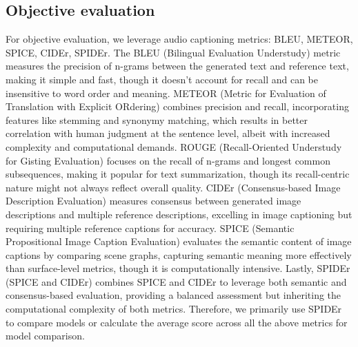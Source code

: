 \subsection{Objective evaluation} \label{appendix: evaluation}  
 \vspace{-0.1in}
For objective evaluation, we leverage audio captioning metrics: BLEU, METEOR, SPICE, CIDEr, SPIDEr. The BLEU (Bilingual Evaluation Understudy) metric measures the precision of n-grams between the generated text and reference text, making it simple and fast, though it doesn't account for recall and can be insensitive to word order and meaning. METEOR (Metric for Evaluation of Translation with Explicit ORdering) combines precision and recall, incorporating features like stemming and synonymy matching, which results in better correlation with human judgment at the sentence level, albeit with increased complexity and computational demands. ROUGE (Recall-Oriented Understudy for Gisting Evaluation) focuses on the recall of n-grams and longest common subsequences, making it popular for text summarization, though its recall-centric nature might not always reflect overall quality. CIDEr (Consensus-based Image Description Evaluation) measures consensus between generated image descriptions and multiple reference descriptions, excelling in image captioning but requiring multiple reference captions for accuracy. SPICE (Semantic Propositional Image Caption Evaluation) evaluates the semantic content of image captions by comparing scene graphs, capturing semantic meaning more effectively than surface-level metrics, though it is computationally intensive. Lastly, SPIDEr (SPICE and CIDEr) combines SPICE and CIDEr to leverage both semantic and consensus-based evaluation, providing a balanced assessment but inheriting the computational complexity of both metrics. Therefore, we primarily use SPIDEr to compare models or calculate the average score across all the above metrics for model comparison.

